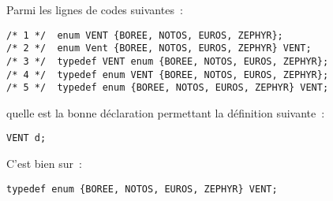 Parmi les lignes de codes suivantes~:
\begin{verbatim}
/* 1 */  enum VENT {BOREE, NOTOS, EUROS, ZEPHYR};
/* 2 */  enum Vent {BOREE, NOTOS, EUROS, ZEPHYR} VENT;
/* 3 */  typedef VENT enum {BOREE, NOTOS, EUROS, ZEPHYR};
/* 4 */  typedef enum VENT {BOREE, NOTOS, EUROS, ZEPHYR};
/* 5 */  typedef enum {BOREE, NOTOS, EUROS, ZEPHYR} VENT;
\end{verbatim}
quelle est la bonne d\'eclaration permettant la d\'efinition suivante~:
\begin{verbatim}
VENT d;
\end{verbatim}
\ifcorrection%
\begin{correction}
C'est bien sur~:
\begin{verbatim}
typedef enum {BOREE, NOTOS, EUROS, ZEPHYR} VENT;
\end{verbatim}
\end{correction}
\fi